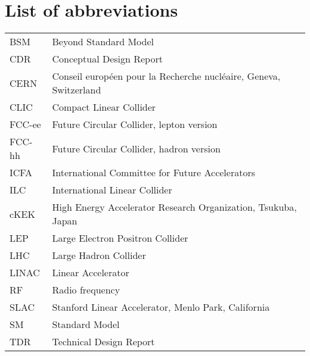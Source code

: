 \chapter*{List of abbreviations}

\begin{tabular}{l l}
BSM		&	Beyond Standard Model\\
CDR		&	Conceptual Design Report\\
CERN	&	Conseil europ\'een pour la Recherche nucl\'eaire, Geneva, Switzerland\\
CLIC		&	Compact Linear Collider\\
FCC-ee	&	Future Circular Collider, lepton version\\
FCC-hh	&	Future Circular Collider, hadron version\\
ICFA		&	International Committee for Future Accelerators\\
ILC		&	International Linear Collider\\
cKEK		&	High Energy Accelerator Research Organization, Tsukuba, Japan      \\  
LEP		&	Large Electron Positron Collider\\
LHC		&	Large Hadron Collider \\
LINAC	&	Linear Accelerator\\
RF		&	Radio frequency\\
SLAC	&	Stanford Linear Accelerator, Menlo Park, California\\
SM		&	Standard Model\\
TDR		&	Technical Design Report\\
\end{tabular}